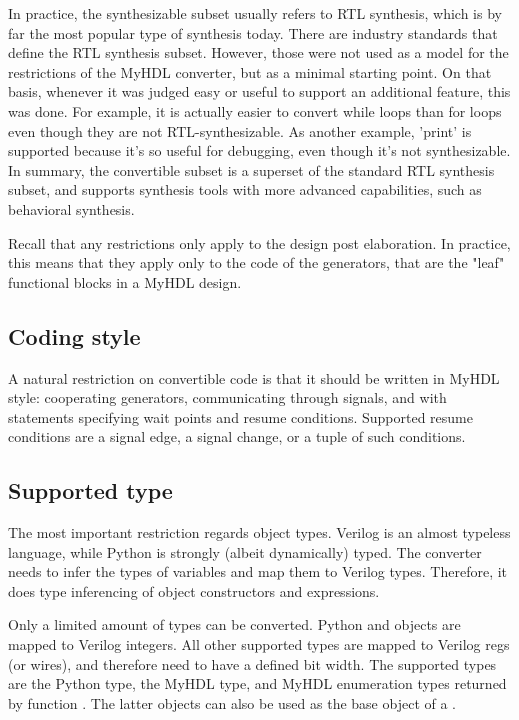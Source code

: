 In practice, the synthesizable subset usually refers to RTL
synthesis, which is by far the most popular type of synthesis
today. There are industry standards that define the RTL synthesis
subset.  However, those were not used as a model for the restrictions
of the MyHDL converter, but as a minimal starting point.  On that
basis, whenever it was judged easy or useful to support an additional
feature, this was done. For example, it is actually easier to convert
while loops than for loops even though they are not RTL-synthesizable.
As another example, 'print' is supported because it's so useful for
debugging, even though it's not synthesizable.  In summary, the
convertible subset is a superset of the standard RTL synthesis subset,
and supports synthesis tools with more advanced capabilities, such as
behavioral synthesis.

Recall that any restrictions only apply to the design post
elaboration.  In practice, this means that they apply only to the code
of the generators, that are the "leaf" functional blocks in a MyHDL
design.

\subsection{Coding style\label{conv-subset-style}}

A natural restriction on convertible code is that it should be
written in MyHDL style: cooperating generators, communicating through
signals, and with  statements specifying wait points and resume
conditions.  Supported resume conditions are a signal edge, a signal
change, or a tuple of such conditions.

\subsection{Supported type\label{conv-subset-types}}

The most important restriction regards object types. Verilog is an
almost typeless language, while Python is strongly (albeit
dynamically) typed. The converter needs to infer the types of
variables and map them to Verilog types. Therefore, it does type
inferencing of object constructors and expressions.

Only a limited amount of types can be converted.
Python  and  objects are mapped to Verilog
integers. All other supported types are mapped to Verilog regs (or
wires), and therefore need to have a defined bit width. The supported
types are the Python  type, the MyHDL  type,
and MyHDL enumeration types returned by function . The
latter objects can also be used as the base object of a
. 

